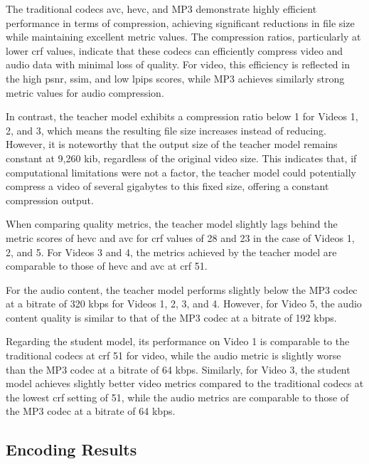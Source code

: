     The traditional codecs \gls{avc}, \gls{hevc}, and MP3 demonstrate highly efficient performance in terms of compression, achieving significant reductions in file size while maintaining excellent metric values. The compression ratios, particularly at lower \gls{crf} values, indicate that these \gls{codec}s can efficiently compress video and audio data with minimal loss of quality. For video, this efficiency is reflected in the high \gls{psnr}, \gls{ssim}, and low \gls{lpips} scores, while MP3 achieves similarly strong metric values for audio compression.

    In contrast, the teacher model exhibits a compression ratio below 1 for Videos 1, 2, and 3, which means the resulting file size increases instead of reducing. However, it is noteworthy that the output size of the teacher model remains constant at 9,260 \gls{kib}, regardless of the original video size. This indicates that, if computational limitations were not a factor, the teacher model could potentially compress a video of several gigabytes to this fixed size, offering a constant compression output.

    When comparing quality metrics, the teacher model slightly lags behind the metric scores of \gls{hevc} and \gls{avc} for \gls{crf} values of 28 and 23 in the case of Videos 1, 2, and 5. For Videos 3 and 4, the metrics achieved by the teacher model are comparable to those of \gls{hevc} and \gls{avc} at \gls{crf} 51.

    For the audio content, the teacher model performs slightly below the MP3 codec at a bitrate of 320 \gls{kbps} for Videos 1, 2, 3, and 4. However, for Video 5, the audio content quality is similar to that of the MP3 codec at a bitrate of 192 \gls{kbps}.

    Regarding the student model, its performance on Video 1 is comparable to the traditional codecs at \gls{crf} 51 for video, while the audio metric is slightly worse than the MP3 codec at a bitrate of 64 \gls{kbps}. Similarly, for Video 3, the student model achieves slightly better video metrics compared to the traditional codecs at the lowest \gls{crf} setting of 51, while the audio metrics are comparable to those of the MP3 codec at a bitrate of 64 \gls{kbps}.

    
    
    \subsection{Encoding Results}
    
